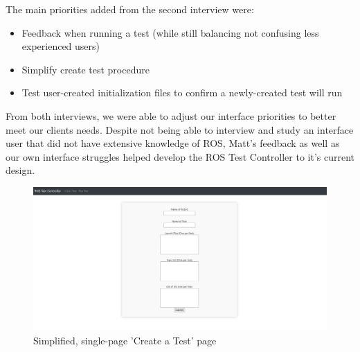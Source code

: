 \documentclass[onecolumn, draftclsnofoot,10pt, compsoc]{IEEEtran}
\begin{document}
The main priorities added from the second interview were:
\begin{itemize}
	\item Feedback when running a test (while still balancing not confusing less experienced users)
	\item Simplify create test procedure
	\item Test user-created initialization files to confirm a newly-created test will run
\end{itemize}

From both interviews, we were able to adjust our interface priorities to better meet our clients needs. Despite not being able to interview and study an interface user that did not have extensive knowledge of ROS, Matt's feedback as well as our own interface struggles helped develop the ROS Test Controller to it's current design. 

\begin{figure}[h]
	\centering
	\includegraphics[width=0.6\linewidth]{"Current Create Test"}
	\caption{Simplified, single-page 'Create a Test' page}
	\label{fig:current-create-test}
\end{figure}
\end{document}

